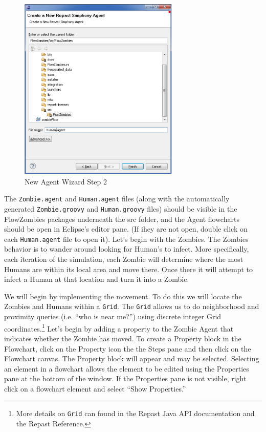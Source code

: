 \documentclass[11pt]{amsart}
\begin{document}
\begin{figure}[h]
\begin{center}
\vspace{.2in}
\centerline {
\includegraphics[width=3in]{figs/newAgentWiz_2.eps}
}
\caption{New Agent Wizard Step 2}
\label{fig:newagent2}
\end{center}
\end{figure}

The \texttt{Zombie.agent}  and \texttt{Human.agent} files (along with the automatically generated \texttt{Zombie.groovy}  and \texttt{Human.groovy} files) should be visible in the FlowZombies packages underneath the src folder, and the Agent flowcharts should be open in Eclipse's editor pane. (If ihey are not open, double click on each \texttt{Human.agent} file to open it). Let's begin with the Zombies. The Zombies behavior is to wander around looking for Human's to infect. More specifically, each iteration of the simulation, each Zombie will determine where the most Humans are within its local area and move there. Once there it will attempt to infect a Human at that location and turn it into a Zombie. 

We will begin by implementing the movement. To do this we will locate the Zombies and Humans within a \texttt{Grid}. The \texttt{Grid} allows us to do neighborhood and proximity queries (i.e. ``who is near me?'') using discrete integer Grid coordinates.\footnote{More details on \texttt{Grid} can found in the Repast Java API documentation and the Repast Reference.} Let's begin by adding a property to the Zombie Agent that indicates whether the Zombie has moved.  To create a Property block in the Flowchart, click on the Property icon the the Steps pane and then click on the Flowchart canvas.  The Property block will appear and may be selected.  Selecting an element in a flowchart allows the element to be edited using the Properties pane at the bottom of the window.  If the Properties pane is not visible, right click on a flowchart element and select ``Show Properties.''
\end{document}
